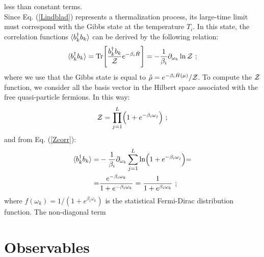 \documentclass[pra,twocolumn,preprintnumbers,amsmath,amssymb,nofootinbib,floatfix,longbibliography]{revtex4}
\begin{document}
  less than constant terms.\\
  Since Eq. (\ref{Lindblad}) represents a thermalization
  process, its large-time limit must correspond with the
  Gibbs state at the temperature $T_i$. In this state, the
  correlation functions $\braket{b^\dagger_k b_k}$
  can be derived by the following relation:
  \begin{align}
    \label{Zcorr}
    \braket{b^\dagger_k b_k} =
    {\rm Tr} \Biggr[ \frac{b^\dagger_k b_k}
                    {\cal Z}e^{-\beta_i \hat H} \Biggr]
    = -\frac{1}{\beta_i}\partial_{\omega_k}\ln{\cal Z}\,\,;
  \end{align}
  where we use that the Gibbs state is equal to
  $\hat \rho = e^{-\beta_i\hat H(\mu)}/{\cal Z}$. To
  compute the ${\cal Z}$ function, we consider all the
  basis vector in the Hilbert space associated with the
  free quasi-particle fermions. In this way:
  \begin{equation}
    {\cal Z} = \prod _{j=1}^L
    \Bigl( 1 + e^{-\beta_i \omega_j} \Bigl) \,\,;
  \end{equation}
  and from Eq. (\ref{Zcorr}):
  \begin{align}
    \braket{b^\dagger_k b_k}= &
    -\frac{1}{\beta_i}\partial_{\omega_k} \sum _{j=1}^L
    \ln\Bigl( 1 + e^{-\beta_i \omega_j} \Bigl)= \\
    = &  \frac{e^{-\beta_i \omega_k}}
            { 1 + e^{-\beta_i \omega_k} } =
    \frac{1}{1 + e^{\beta_i \omega_k}}
    \,\,;
  \end{align}
  where $f(\omega_k) = 1 / (1 + e^{\beta_i \omega_k})$ is
  the statistical Fermi-Dirac distribution function. The
  non-diagonal term

\section{Observables}
\label{observables}
\end{document}
